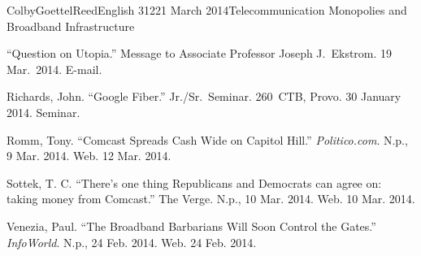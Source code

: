 \documentclass[12pt]{article}
\begin{document}
\begin{mla}{Colby}{Goettel}{Reed}{English 312}{21 March 2014}{Telecommunication Monopolies and Broadband Infrastructure}
\begin{workscited}
    \bibent ``Question on Utopia.'' Message to Associate Professor Joseph J.\ Ekstrom. 19 Mar.\ 2014. E-mail.
    
    \bibent Richards, John. ``Google Fiber.'' Jr./Sr.\ Seminar. 260~CTB, Provo. 30 January 2014. Seminar.
    
    \bibent Romm, Tony. ``Comcast Spreads Cash Wide on Capitol Hill.'' \textit{Politico.com}. N.p., 9 Mar. 2014. Web. 12 Mar. 2014.
    
    \bibent Sottek, T. C. ``There's one thing Republicans and Democrats can agree on: taking money from Comcast.'' The Verge. N.p., 10 Mar. 2014. Web. 10 Mar. 2014.
    
    \bibent Venezia, Paul. ``The Broadband Barbarians Will Soon Control the Gates.'' \textit{InfoWorld}. N.p., 24 Feb. 2014. Web. 24 Feb. 2014.
\end{workscited}

\end{mla}
\end{document}
